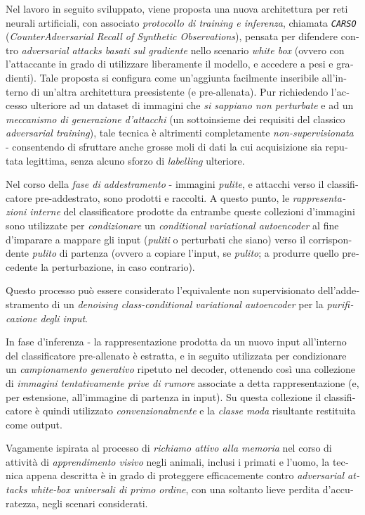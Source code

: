 \begin{otherlanguage}{italian}
Nel lavoro in seguito sviluppato, viene proposta una nuova architettura per reti neurali artificiali, con associato \textit{protocollo di training e inferenza}, chiamata \textit{\texttt{CARSO}} (\textit{CounterAdversarial Recall of Synthetic Observations}), pensata per difendere contro \textit{adversarial attacks basati sul gradiente} nello scenario \textit{white box} (ovvero con l'attaccante in grado di utilizzare liberamente il modello, e accedere a pesi e gradienti). Tale proposta si configura come un'aggiunta facilmente inseribile all'interno di un'altra architettura preesistente (e pre-allenata). Pur richiedendo l'accesso ulteriore ad un dataset di immagini che \textit{si sappiano non perturbate} e ad un \textit{meccanismo di generazione d'attacchi} (un sottoinsieme dei requisiti del classico \textit{adversarial training}), tale tecnica è altrimenti completamente \textit{non-supervisionata} - consentendo di sfruttare anche grosse moli di dati la cui acquisizione sia reputata legittima, senza alcuno sforzo di \textit{labelling} ulteriore.

Nel corso della \textit{fase di addestramento} - immagini \textit{pulite}, e attacchi verso il classificatore pre-addestrato, sono prodotti e raccolti. A questo punto, le \textit{rappresentazioni interne} del classificatore prodotte da entrambe queste collezioni d'immagini sono utilizzate per \textit{condizionare} un \textit{conditional variational autoencoder} al fine d'imparare a mappare gli input (\textit{puliti} o perturbati che siano) verso il corrispondente \textit{pulito} di partenza (ovvero a copiare l'input, se \textit{pulito}; a produrre quello precedente la perturbazione, in caso contrario).

Questo processo può essere considerato l'equivalente non supervisionato dell'addestramento di un \textit{denoising class-conditional variational autoencoder} per la \textit{purificazione degli input}.

In fase d'inferenza - la rappresentazione prodotta da un nuovo input all'interno del classificatore pre-allenato è estratta, e in seguito utilizzata per condizionare un \textit{campionamento generativo} ripetuto nel decoder, ottenendo così una collezione di \textit{immagini tentativamente prive di rumore} associate a detta rappresentazione (e, per estensione, all'immagine di partenza in input). Su questa collezione il classificatore è quindi utilizzato \textit{convenzionalmente} e la \textit{classe moda} risultante restituita come output.

Vagamente ispirata al processo di \textit{richiamo attivo alla memoria} nel corso di attività di \textit{apprendimento visivo} negli animali, inclusi i primati e l'uomo, la tecnica appena descritta è in grado di proteggere efficacemente contro \textit{adversarial attacks white-box universali di primo ordine}, con una soltanto lieve perdita d'accuratezza, negli scenari considerati.


\end{otherlanguage}
